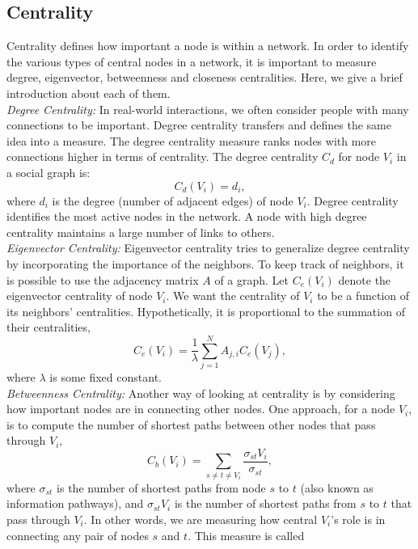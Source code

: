 \subsection{Centrality}\label{Chap2_01_03}
Centrality defines how important a node is within a network. In order to identify the various types of central nodes in a network, it is important to measure degree, eigenvector, betweenness and closeness centralities. Here, we give a brief introduction about each of them.\\
\emph{Degree Centrality:} In real-world interactions, we often consider people with many connections to be important. Degree centrality transfers and defines the same idea into a measure. The degree centrality measure ranks nodes with more connections higher in terms of centrality. The degree centrality $C_d$ for node $V_i$ in a social graph is:
\begin{equation}
C_d(V_i)=d_i,
\end{equation}
where $d_i$ is the degree (number of adjacent edges) of node $V_i$. Degree centrality identifies the most active nodes in the network. A node with high degree
centrality maintains a large number of links to others. \\
\emph{Eigenvector Centrality:} Eigenvector centrality tries to generalize degree centrality by incorporating the importance of the neighbors. To keep track of neighbors, it is possible to use the adjacency matrix $A$ of a graph. Let $C_e(V_i)$ denote the eigenvector centrality of node $V_i$. We want the centrality of $V_i$ to be a function of its neighbors' centralities. Hypothetically, it is proportional to the summation of their centralities,
\begin{equation}
C_e(V_i)=\frac{1}{\lambda}\sum_{j=1}^N A_{j,i}C_e(V_j),
\end{equation}
where $\lambda$ is some fixed constant.\\
\emph{Betweenness Centrality:} Another way of looking at centrality is by considering how important nodes are in connecting other nodes. One approach, for a node $V_i$, is to compute the number of shortest paths between other nodes that pass through $V_i$,
\begin{equation}
C_b(V_i)=\sum_{s\neq t\neq V_i}\frac{\sigma_{st}V_i}{\sigma_{st}},
\end{equation}
where $\sigma_{st}$ is the number of shortest paths from node $s$ to $t$ (also known as information pathways), and $\sigma_{st}V_i$ is the number of shortest paths from $s$ to $t$ that pass through $V_i$. In other words, we are measuring how central $V_i$'s role is in connecting any pair of nodes $s$ and $t$. This measure is called
